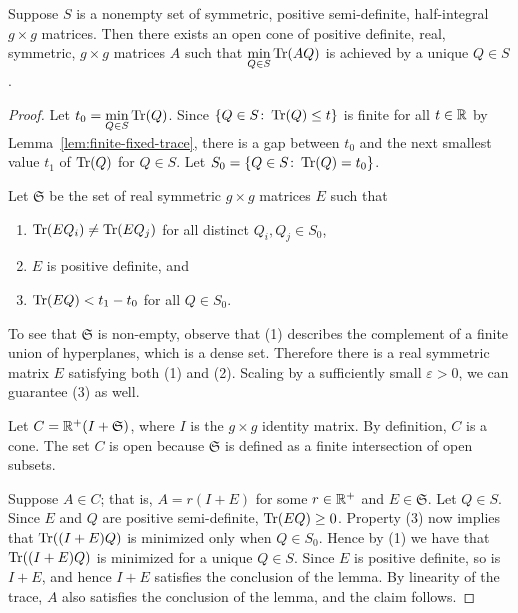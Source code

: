 \documentclass{amsart}
\begin{document}
\begin{lemma}\label{lem:unique-minimizer}
  Suppose $S$ is a nonempty set of symmetric, positive semi-definite, half-integral $g \times g$ matrices. Then there exists an open cone of positive definite, real, symmetric, $g \times g$ matrices $A$ such that $\displaystyle\min_{Q \in S}\operatorname{Tr}(AQ)$ is achieved by a unique $Q\in S$.
\end{lemma}
\begin{proof}
Let $t_0 = \displaystyle\min_{Q \in S}\operatorname{Tr}(Q)$.
  Since $\{Q \in S \colon \operatorname{Tr}(Q) \leq t\}$ is finite for all $t \in \mathbb{R}$ by Lemma~\ref{lem:finite-fixed-trace},
  there is a gap between $t_0$ and the next smallest value $t_1$ of $\operatorname{Tr}(Q)$ for $Q \in S$. Let $S_0 = \{Q \in S \colon \operatorname{Tr}(Q) = t_0\}$.

  Let $\mathfrak{S}$ be the set of real symmetric $g \times g$ matrices $E$ such that
  \begin{enumerate}
    \item $\operatorname{Tr}(EQ_i) \neq \operatorname{Tr}(EQ_j)$ for all distinct $Q_i,Q_j \in S_0$,
    \item $E$ is positive definite, and
    \item $\operatorname{Tr}(EQ) < t_1 - t_0$ for all $Q\in S_0$.
  \end{enumerate}
  To see that $\mathfrak{S}$ is non-empty, observe that (1) describes the complement of a finite union of hyperplanes, which is a dense set. Therefore there is a real symmetric matrix $E$ satisfying both (1) and (2). Scaling by a sufficiently small $\varepsilon > 0$, we can guarantee (3) as well.

  Let $C = \mathbb{R}^+(I + \mathfrak{S})$, where $I$ is the $g \times g$ identity matrix. By definition, $C$ is a cone. The set $C$ is open because $\mathfrak{S}$ is defined as a finite intersection of open subsets.

  Suppose $A \in C$; that is, $A = r(I+E)$ for some $r \in \mathbb{R}^+$ and $E \in \mathfrak{S}$. Let $Q \in S$. Since $E$ and $Q$ are positive semi-definite, $\operatorname{Tr}(EQ)\ge 0$. Property (3) now implies that $\operatorname{Tr}((I+E)Q)$ is minimized only when $Q \in S_0$. Hence by (1) we have that $\operatorname{Tr}((I+E)Q)$ is minimized for a unique $Q \in S$. Since $E$ is positive definite, so is $I+E$, and hence $I + E$ satisfies the conclusion of the lemma. By linearity of the trace, $A$ also satisfies the conclusion of the lemma, and the claim follows.
\end{proof}
\end{document}
